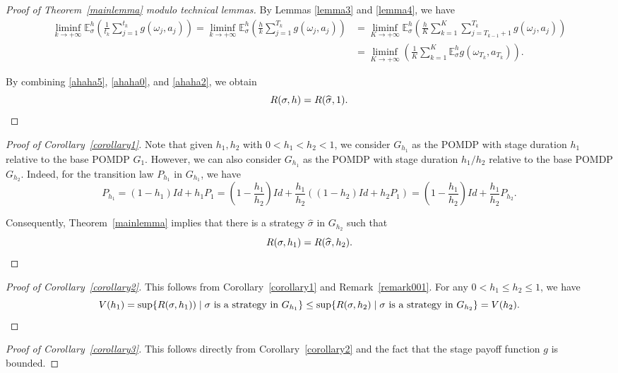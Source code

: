 \documentclass[english,openary,11pt]{article}
\theoremstyle{definition}
\newcommand{\E}{\mathbb{E}}
\begin{document}
\begin{proof}[Proof of Theorem~\ref{mainlemma} modulo technical lemmas]
By Lemmas \ref{lemma3} and \ref{lemma4}, we have
\begin{equation}
\begin{aligned}
\liminf_{k \to +\infty} \E_{\sigma}^h\left( \frac{1}{t_k} \sum_{j = 1}^{t_k} g(\omega_j, a_j) \right)
=
\liminf_{k \to +\infty} \E_{\sigma}^h\left( \frac{h}{k} \sum_{j = 1}^{T_k} g(\omega_j, a_j) \right) 
&=
\liminf_{K \to +\infty} \E_{\sigma}^h\left( \frac{h}{K} \sum_{k = 1}^{K} \sum_{j = T_{k-1}+1}^{T_k} g(\omega_j, a_j) \right)
\\
&= \liminf_{K \to +\infty} \left( \frac{1}{K} \sum_{k = 1}^{K} \E_\sigma^h g(\omega_{T_k}, a_{T_k}) \right).
\end{aligned}
\label{ahaha2}
\end{equation}

By combining \eqref{ahaha5}, \eqref{ahaha0}, and \eqref{ahaha2}, we obtain
$$R(\sigma, h) = R(\widehat \sigma, 1).\qedhere$$
\end{proof}

\begin{proof}[Proof of Corollary~\ref{corollary1}]
Note that given $h_1, h_2$ with $0 < h_1 < h_2 < 1$, we consider $G_{h_1}$ as the POMDP with stage duration $h_1$ relative to the base POMDP $G_1$. However, we can also consider $G_{h_1}$ as the POMDP with stage duration $h_1 / h_2$ relative to the base POMDP $G_{h_2}$. Indeed, for the transition law $P_{h_1}$ in $G_{h_1}$, we have
$$P_{h_1} = (1 - h_1) Id + h_1 P_1 = \left(1 - \frac {h_1} {h_2}\right) Id + \frac{h_1}{h_2} (\left(1 - h_2\right) Id + h_2 P_1) = \left(1 - \frac {h_1} {h_2}\right) Id + \frac{h_1}{h_2} P_{h_2}.$$

Consequently, Theorem~\ref{mainlemma} implies that there is a strategy $\widehat \sigma$ in $G_{h_2}$ such that
$$R(\sigma, h_1) = R(\widehat \sigma, h_2). \qedhere$$
\end{proof}

\begin{proof}[Proof of Corollary~\ref{corollary2}]
This follows from Corollary~\ref{corollary1} and Remark~\ref{remark001}. For any $0 < h_1 \le h_2 \le 1$, we have
$$V(h_1) = \sup\{R(\sigma, h_1)) \; | \; \sigma \text{ is a strategy in }G_{h_1} \} \le  \sup\{R(\sigma, h_2) \; | \; \sigma \text{ is a strategy in }G_{h_2} \} = V(h_2). \qedhere$$
\end{proof}

\begin{proof}[Proof of Corollary~\ref{corollary3}]
This follows directly from Corollary~\ref{corollary2} and the fact that the stage payoff function $g$ is bounded.
\end{proof}
\end{document}
